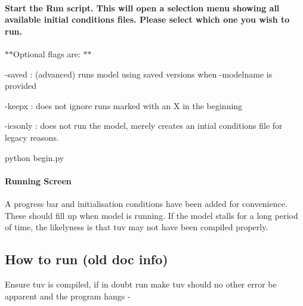 \paragraph*{Start the Run script. This will open a selection menu showing all available initial conditions files. Please select which one you wish to run.}

$\ast$$\ast$\+Optional flags are\+: $\ast$$\ast$

-\/saved \+: (advanced) runs model using saved versions when -\/modelname is provided

-\/keepx \+: does not ignore runs marked with an X in the beginning

-\/icsonly \+: does not run the model, merely creates an intial conditions file for legacy reasons.


\begin{DoxyCode}
python begin.py
\end{DoxyCode}




\paragraph*{Running Screen}

A progress bar and initialisation conditions have been added for convenience. These should fill up when model is running. If the model stalls for a long period of time, the likelyness is that tuv may not have been compiled properly.



\subsection*{How to run (old doc info)}

Ensure tuv is compiled, if in doubt run {\ttfamily make tuv} should no other error be apparent and the program hangs -\/


